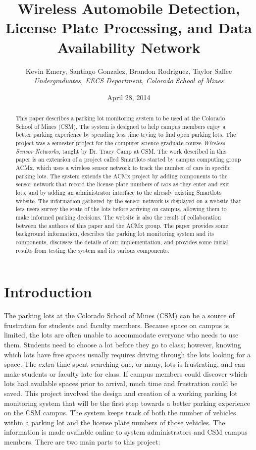 \documentclass[11pt, oneside, fullpage, doublespace]{article}
\title{Wireless Automobile Detection, License Plate Processing, and Data Availability Network}
\author{Kevin Emery, Santiago Gonzalez, Brandon Rodriguez, Taylor Sallee\\ \emph{Undergraduates, EECS Department, Colorado School of Mines}}
\date{April 28, 2014}
\begin{document}
\maketitle

\begin{abstract}
This paper describes a parking lot monitoring system to be used at the Colorado School of Mines (CSM). The system is designed to help campus members enjoy a better parking experience by spending less time trying to find open parking lots. The project was a semester project for the computer science graduate course \emph{Wireless Sensor Networks}, taught by Dr. Tracy Camp at CSM. The work described in this paper is an extension of a project called Smartlots started by campus computing group ACMx, which uses a wireless sensor network to track the number of cars in specific parking lots. The system extends the ACMx project by adding components to the sensor network that record the license plate numbers of cars as they enter and exit lots, and by adding an administrator interface to the already existing Smartlots website. The information gathered by the sensor network is displayed on a website that lets users survey the state of the lots before arriving on campus, allowing them to make informed parking decisions. The website is also the result of collaboration between the authors of this paper and the ACMx group. The paper provides some background information, describes the parking lot monitoring system and its components, discusses the details of our implementation, and provides some initial results from testing the system and its various components.
\end{abstract}

\section{Introduction}
The parking lots at the Colorado School of Mines (CSM) can be a source of frustration for students and faculty members. Because space on campus is limited, the lots are often unable to accommodate everyone who needs to use them. Students need to choose a lot before they go to class; however, knowing which lots have free spaces usually requires driving through the lots looking for a space. The extra time spent searching one, or many, lots is frustrating, and can make students or faculty late for class. If campus members could discover which lots had available spaces prior to arrival, much time and frustration could be saved. This project involved the design and creation of a working parking lot monitoring system that will be the first step towards a better parking experience on the CSM campus. The system keeps track of both the number of vehicles within a parking lot and the license plate numbers of those vehicles. The information is made available online to system administrators and CSM campus members. There are two main parts to this project:
\end{document}
